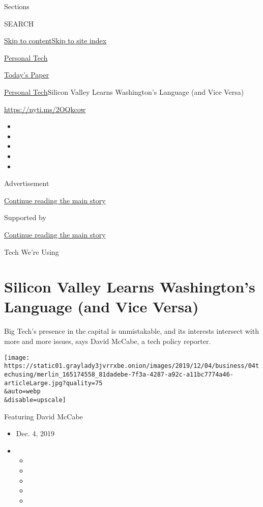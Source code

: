 Sections

SEARCH

\protect\hyperlink{site-content}{Skip to
content}\protect\hyperlink{site-index}{Skip to site index}

\href{https://www.nytimes3xbfgragh.onion/section/technology/personaltech}{Personal
Tech}

\href{https://myaccount.nytimes3xbfgragh.onion/auth/login?response_type=cookie\&client_id=vi}{}

\href{https://www.nytimes3xbfgragh.onion/section/todayspaper}{Today's
Paper}

\href{/section/technology/personaltech}{Personal Tech}\textbar{}Silicon
Valley Learns Washington's Language (and Vice Versa)

\href{https://nyti.ms/2OQkcow}{https://nyti.ms/2OQkcow}

\begin{itemize}
\item
\item
\item
\item
\item
\end{itemize}

Advertisement

\protect\hyperlink{after-top}{Continue reading the main story}

Supported by

\protect\hyperlink{after-sponsor}{Continue reading the main story}

Tech We're Using

\hypertarget{silicon-valley-learns-washingtons-language-and-vice-versa}{%
\section{Silicon Valley Learns Washington's Language (and Vice
Versa)}\label{silicon-valley-learns-washingtons-language-and-vice-versa}}

Big Tech's presence in the capital is unmistakable, and its interests
intersect with more and more issues, says David McCabe, a tech policy
reporter.

\texttt{[image: https://static01.graylady3jvrrxbe.onion/images/2019/12/04/business/04techusing/merlin\_165174558\_81dadebe-7f3a-4287-a92c-a11bc7774a46-articleLarge.jpg?quality=75\\\&auto=webp\\\&disable=upscale]}

Featuring David McCabe

\begin{itemize}
\item
  Dec. 4, 2019
\item
  \begin{itemize}
  \item
  \item
  \item
  \item
  \item
  \end{itemize}
\end{itemize}

